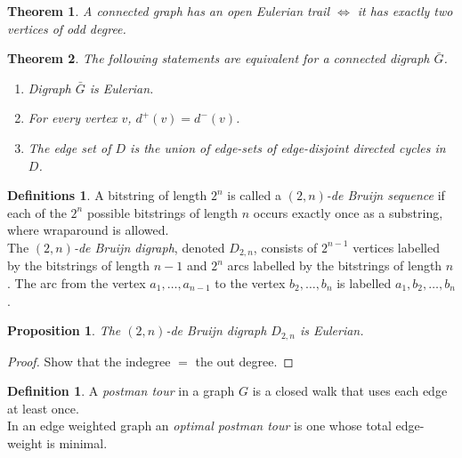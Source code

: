 \documentclass{article}
\newtheorem*{thm}{Theorem}
\newtheorem*{prop}{Proposition}
\theoremstyle{definition}
\newtheorem*{defn}{Definition}
\newtheorem*{defns}{Definitions}
\begin{document}
\begin{thm}
A connected graph has an open Eulerian trail $\iff$ it has exactly two vertices of odd degree.
\end{thm}

\begin{thm}
The following statements are equivalent for a connected digraph $\bar{G}$.
\begin{enumerate}
\item Digraph $\bar{G}$ is Eulerian.
\item For every vertex $v$, $d^+(v) = d^-(v)$.
\item The edge set of $D$ is the union of edge-sets of edge-disjoint directed cycles in $D$.
\end{enumerate}
\end{thm}

\begin{defns}
A bitstring of length $2^n$ is called a \emph{$(2,n)$-de Bruijn sequence} if each of the $2^n$ possible bitstrings of length $n$ occurs exactly once as a substring, where wraparound is allowed. \\
The \emph{$(2,n)$-de Bruijn digraph}, denoted $D_{2,n}$, consists of $2^{n-1}$ vertices labelled by the bitstrings of length $n-1$ and $2^n$ arcs labelled by the bitstrings of length $n$.
The arc from the vertex $a_1,\ldots,a_{n-1}$ to the vertex $b_2,\ldots,b_n$ is labelled $a_1,b_2,\ldots,b_n$.
\end{defns}

\begin{prop}
The $(2,n)$-de Bruijn digraph $D_{2,n}$ is Eulerian.
\end{prop}

\begin{proof}
Show that the indegree $=$ the out degree.
\end{proof}


\begin{defn}
A \emph{postman tour} in a graph $G$ is a closed walk that uses each edge at least once. \\
In an edge weighted graph an \emph{optimal postman tour} is one whose total edge-weight is minimal.
\end{defn}
\end{document}
